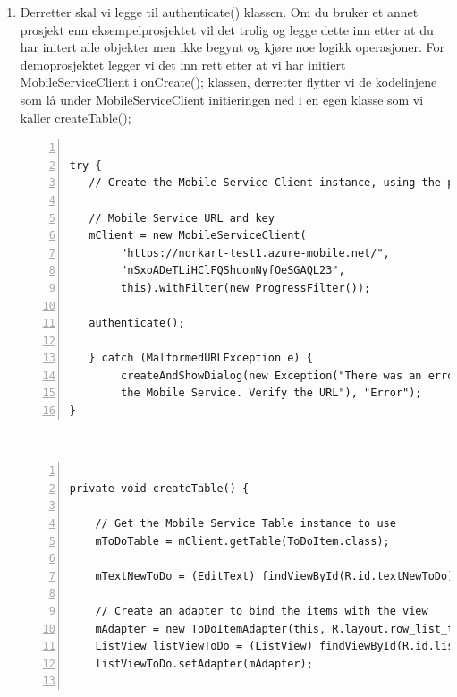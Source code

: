 \begin{enumerate}
\begin{lstlisting}[numbers=left, captionpos=b,   caption={Eksempel som viser hvordan authenticate klassen kan se ut.}, ]
\end{lstlisting}
\\
\item Derretter skal vi legge til authenticate() klassen. Om du bruker et annet prosjekt enn eksempelprosjektet vil det trolig og legge dette inn etter at du har initert alle objekter men ikke begynt og kjøre noe logikk operasjoner. For demoprosjektet legger vi det inn rett etter at vi har initiert MobileServiceClient i onCreate(); klassen, derretter flytter vi de kodelinjene som lå under MobileServiceClient initieringen ned i en egen klasse som vi kaller createTable(); 
\\
\begin{lstlisting}[numbers=left, captionpos=b,   caption={Eksempel som viser hvordan onCreate() klassen ser ut etter at kode er flytte til en egen createTable() klasse.}, ]

try {
   // Create the Mobile Service Client instance, using the provided
   
   // Mobile Service URL and key
   mClient = new MobileServiceClient(
        "https://norkart-test1.azure-mobile.net/",
        "nSxoADeTLiHClFQShuomNyfOeSGAQL23",
        this).withFilter(new ProgressFilter());
   
   authenticate();
   
   } catch (MalformedURLException e) {
        createAndShowDialog(new Exception("There was an error creating 
        the Mobile Service. Verify the URL"), "Error");
}
\end{lstlisting}
\\
\begin{lstlisting}[numbers=left, captionpos=b,   caption={Eksempel som viser hvordan createTable() klassen kan se ut.}, ]

private void createTable() {

    // Get the Mobile Service Table instance to use
    mToDoTable = mClient.getTable(ToDoItem.class);

    mTextNewToDo = (EditText) findViewById(R.id.textNewToDo);

    // Create an adapter to bind the items with the view
    mAdapter = new ToDoItemAdapter(this, R.layout.row_list_to_do);
    ListView listViewToDo = (ListView) findViewById(R.id.listViewToDo);
    listViewToDo.setAdapter(mAdapter);


\end{lstlisting}
\end{enumerate}
